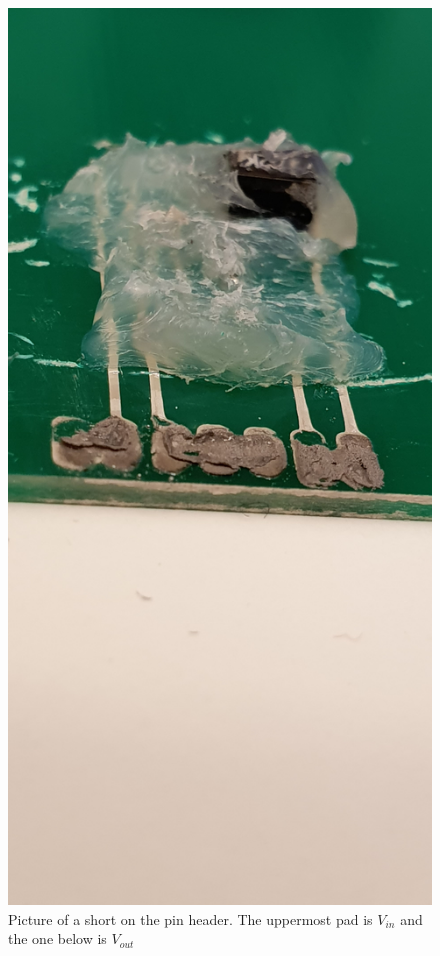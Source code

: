 \begin{figure}[h]
    \includegraphics[width=\linewidth]{ela302-kortslutning.jpg}
    \caption{Picture of a short on the pin header. The uppermost pad is $V_{in}$ and the one below is $V_{out}$}
    \label{fig:short}
\end{figure}
